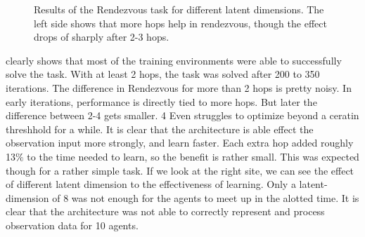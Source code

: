 \begin{figure}[htp]
    \centering
    \hspace{1cm}                       
    \caption{Results of the Rendezvous task for different latent dimensions. The left side shows that more hops help in rendezvous, though the effect drops of sharply after 2-3 hops. }
    \label{fig:proof_of_concept_rendezvous}
\end{figure}


 clearly shows that most of the training environments were able to successfully solve the task. With at least 2 hops, the task was solved after 200 to 350 iterations. The difference in Rendezvous for more than 2 hops is pretty noisy. In early iterations, performance is directly tied to more hops. But later the difference between 2-4 gets smaller. 4 Even struggles to optimize beyond a ceratin threshhold for a while. It is clear that the architecture is able effect the observation input more strongly, and learn faster. Each extra hop added roughly 13$\%$ to the time needed to learn, so the benefit is rather small. This was expected though for a rather simple task. If we look at the right site, we can see the effect of different latent dimension to the effectiveness of learning. Only a latent-dimension of 8 was not enough for the agents to meet up in the alotted time. It is clear that the architecture was not able to correctly represent and process observation data for 10 agents.\par

